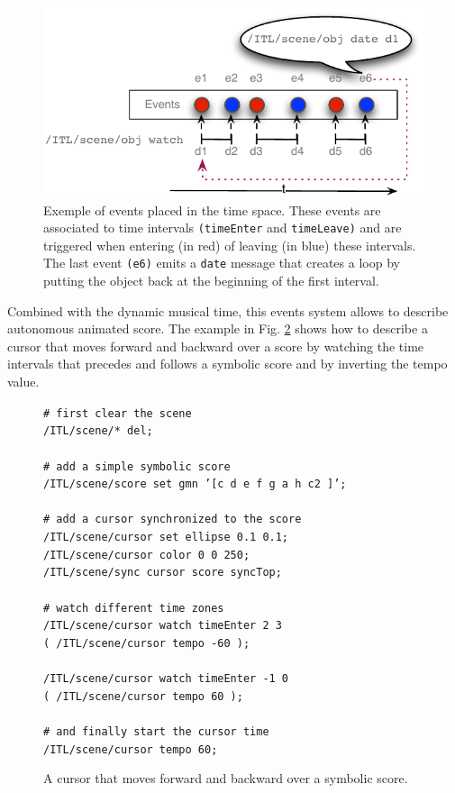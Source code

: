 \documentclass[11pt,a4paper]{article}
\newcommand{\OSC}[1]	{{\fontsize{10pt}{10pt} \selectfont\texttt{#1}}}
\newcommand{\tab}		{\hspace*{4mm}}
\newcommand{\sample}[1]	{\vspace{-0.2em}\begin{center}\colorbox{mygrey}{\begin{minipage}[t]{0.98\columnwidth} {\small \texttt{#1}}\end{minipage}}\end{center}}
\begin{document}
\begin{figure}[h]
   \centering
   \includegraphics[width=0.95\columnwidth]{imgs/events}
   \caption{Exemple of events placed in the time space. These events are associated to time intervals \OSC{(timeEnter} and \OSC{timeLeave)} and are triggered when entering (in red) of leaving (in blue) these intervals. The last event \OSC{(e6)} emits a  \OSC{date} message that creates a loop by putting the object back at the beginning of the first interval.}
   \label{fig:events}
\end{figure}

Combined with the dynamic musical time, this events system allows to describe autonomous animated score. The example in Fig. \ref{fig:ascore} shows how to describe a cursor that moves forward and backward over a score by watching the time intervals that precedes and follows a symbolic score and by inverting the tempo value. 

\begin{figure}[h]
\begin{center}
   \sample{\# first clear the scene \\
/ITL/scene/* del; \\
\\
\# add a simple symbolic score \\
/ITL/scene/score set gmn '[c d e f g a h c2 ]'; \\
\\
\# add a cursor synchronized to the score \\
/ITL/scene/cursor set ellipse 0.1 0.1;\\
/ITL/scene/cursor color 0 0 250;\\
/ITL/scene/sync cursor score syncTop;\\
\\
\# watch different time zones \\
/ITL/scene/cursor watch timeEnter 2 3 \\
\tab ( /ITL/scene/cursor tempo -60 );\\
\\
/ITL/scene/cursor watch timeEnter -1 0 \\
\tab ( /ITL/scene/cursor tempo 60 );\\
\\
\# and finally start the cursor time \\
/ITL/scene/cursor tempo 60;\\
}
\caption{A cursor that moves forward and backward over a symbolic score.}
\label{fig:ascore}
\end{center}
\end{figure}
\end{document}

